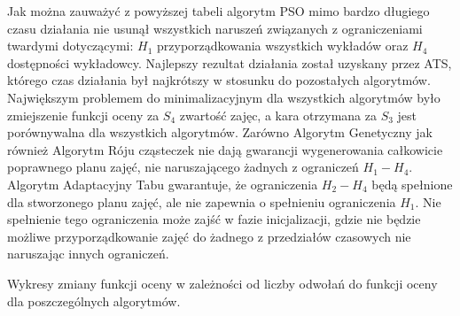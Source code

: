 Jak można zauważyć z powyższej tabeli algorytm PSO mimo bardzo długiego czasu działania nie usunął wszystkich naruszeń związanych z ograniczeniami twardymi dotyczącymi: ${H}_{1}$ przyporządkowania wszystkich wykładów oraz $H_{4}$ dostępności wykładowcy. Najlepszy rezultat działania został uzyskany przez ATS, którego czas działania był najkrótszy w stosunku do pozostałych algorytmów. Największym problemem do minimalizacyjnym dla wszystkich algorytmów było zmiejszenie funkcji oceny za $S_{4}$ zwartość zajęc, a kara otrzymana za $S_{3}$ jest porównywalna dla wszystkich algorytmów. 
Zarówno Algorytm Genetyczny jak również Algorytm Róju cząsteczek nie dają gwarancji wygenerowania całkowicie poprawnego planu zajęć, nie naruszającego żadnych z ograniczeń $H_{1}-H_{4}$. Algorytm Adaptacyjny Tabu gwarantuje, że ograniczenia $H_{2}-H_{4}$ będą spełnione dla stworzonego planu zajęć, ale nie zapewnia o spełnieniu ograniczenia ${H}_{1}$. Nie spełnienie tego ograniczenia może zajść w fazie inicjalizacji, gdzie nie będzie możliwe przyporządkowanie zajęć do żadnego z przedziałów czasowych nie naruszając innych ograniczeń.
\par  Wykresy zmiany funkcji oceny w zależności od liczby odwołań do funkcji oceny dla poszczególnych algorytmów.

